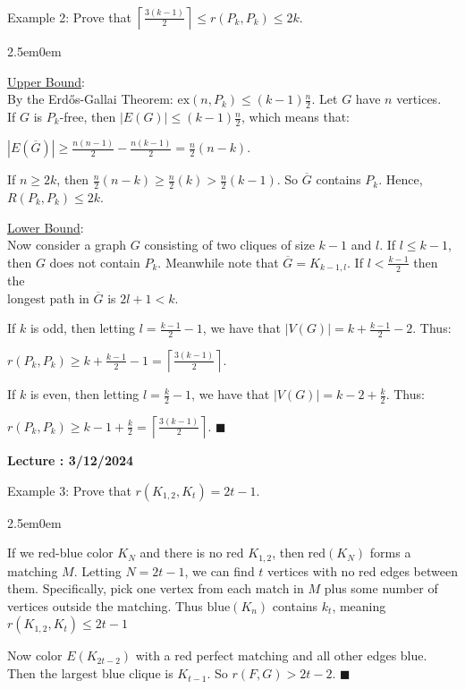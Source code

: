 \documentclass{book}
\newcommand{\exTwo}{%
   \color{RedViolet}%
   \fontsize{13}{15}\selectfont%
}
\newenvironment{myIndent}{%
   \begin{adjustwidth}{2.5em}{0em}%
}{%
   \end{adjustwidth}%
}
\newcounter{LectureNumber}
\newcommand*{\markLecture}[1]{%
   \stepcounter{LectureNumber}%
   {\huge \color{Black} \textbf{Lecture \theLectureNumber: #1} \newline}%
}
\newcommand{\exNums}[1]{\mathrm{ex}(#1)}
\newcommand{\retTwo}{\hfill\bigbreak}
\begin{document}
Example 2: Prove that $\left\lceil \frac{3(k-1)}{2} \right\rceil \leq r(P_k, P_k) \leq 2k$.
{\begin{myIndent} \exTwo
   \ul{Upper Bound}: \\ [2pt]
   By the Erd\H{o}s-Gallai Theorem: $\exNums{n, P_k} \leq (k-1)\frac{n}{2}$. Let $G$ have $n$ vertices.\\ If $G$ is $P_k$-free, then $|E(G)| \leq (k-1)\frac{n}{2}$, which means that:
   
   {\centering$|E(\overbar{G})| \geq \frac{n(n-1)}{2} - \frac{n(k-1)}{2} = \frac{n}{2}(n-k)$.\\[9pt]\par}
   
   If $n \geq 2k$, then $\frac{n}{2}(n-k) \geq \frac{n}{2}(k) > \frac{n}{2}(k-1)$. So $\overbar{G}$ contains $P_k$. Hence,\\
   $R(P_k, P_k) \leq 2k$.\retTwo

   \ul{Lower Bound}:\\ [2pt]
   Now consider a graph $G$ consisting of two cliques of size $k-1$ and $l$. If $l \leq k-1$,\\[-3pt] then $G$ does not contain $P_k$. Meanwhile note that $\overbar{G} = K_{k-1, l}$. If $l < \frac{k-1}{2}$ then the\\ [-3pt] longest path in $\overbar{G}$ is $2l + 1 < k$.\retTwo
   
   If $k$ is odd, then letting $l = \frac{k-1}{2} - 1$, we have that $|V(G)| = k + \frac{k-1}{2} - 2$. Thus:

   {\centering$r(P_k, P_k) \geq k + \frac{k-1}{2} - 1 = \left\lceil \frac{3(k-1)}{2} \right\rceil$.\retTwo\par}
   
   If $k$ is even, then letting $l = \frac{k}{2} - 1$, we have that $|V(G)| = k - 2 + \frac{k}{2}$. Thus: 

   {\centering$r(P_k, P_k) \geq k - 1 + \frac{k}{2} =  \left\lceil \frac{3(k-1)}{2} \right\rceil$. $\blacksquare$\retTwo\par}
\end{myIndent}}

\markLecture{3/12/2024}

Example 3: Prove that $r(K_{1,2}, K_t) = 2t-1$.
{\begin{myIndent} \exTwo
   If we red-blue color $K_N$ and there is no red $K_{1,2}$, then $\textrm{red}(K_N)$ forms a matching $M$. Letting $N = 2t - 1$, we can find $t$ vertices with no red edges between them. Specifically, pick one vertex from each match in $M$ plus some number of vertices outside the matching. Thus $\textrm{blue}(K_n)$ contains $k_t$, meaning $r(K_{1,2}, K_t) \leq 2t - 1$

   \newpage

   Now color $E(K_{2t-2})$ with a red perfect matching and all other edges blue. Then the largest blue clique is $K_{t-1}$. So $r(F, G) > 2t-2$. $\blacksquare$\retTwo
\end{myIndent}}
\end{document}
